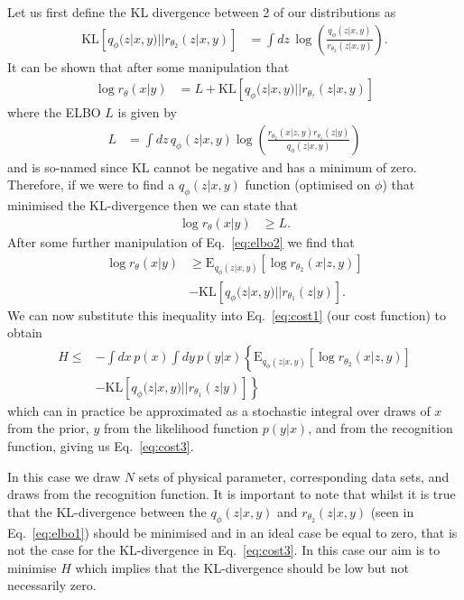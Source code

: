 \documentclass[%
showpacs,
 amsmath,amssymb,
 aps,
 twocolumn,
 prl,
 reprint,
floatfix,
]{revtex4-1}
\begin{document}
Let us first define the \ac{KL} divergence between 2 of our
distributions as
%
\begin{align}\label{eq:kl}
\text{KL}\left[q_{\phi}(z|x,y)||r_{\theta_{2}}(z|x,y)\right] &= \int dz\,
\log\left(\frac{q_{\phi}(z|x,y)}{r_{\theta_{2}}(z|x,y)}\right).
\end{align}
%  
It can be shown that after some manipulation that
%
\begin{align}\label{eq:elbo1}
\log r_{\theta}(x|y) &= L + \text{KL}\left[q_{\phi}(z|x,y)||r_{\theta_{?}}(z|x,y)\right]
\end{align}
%
where the \ac{ELBO} $L$ is given by
%
\begin{align}\label{eq:elbo2}
L &= \int dz\,
q_{\phi}(z|x,y)\log\left(\frac{r_{\theta_{2}}(x|z,y)r_{\theta_{1}}(z|y)}{q_{\phi}(z|x,y)}\right)
\end{align}
%
and is so-named since $\text{KL}$ cannot be negative and has a minimum of zero.
Therefore, if we were to find a $q_{\phi}(z|x,y)$ function (optimised on
$\phi$) that minimised the \ac{KL}-divergence then we can state that
%
\begin{align}
\log r_{\theta}(x|y) &\geq L.
\end{align}
%
After some further manipulation of Eq.~\ref{eq:elbo2} we find that
%
\begin{align}\label{eq:logr}
\log r_{\theta}(x|y) &\geq  \text{E}_{q_{\phi}(z|x,y)}\left[\log
r_{\theta_{2}}(x|z,y)\right] \nonumber\\
&-\text{KL}\left[q_{\phi}(z|x,y)||r_{\theta_{1}}(z|y)\right].
\end{align}
%
We can now substitute this inequality into Eq.~\ref{eq:cost1} (our cost
function) to obtain
%
\begin{align}\label{eq:cost2}
H \leq & -\int dx\, p(x)\int dy\,p(y|x)
\left\{\text{E}_{q_{\phi}(z|x,y)}\left[\log r_{\theta_{2}}(x|z,y)\right]
\right.\nonumber\\
&-\left.\text{KL}\left[q_{\phi}(z|x,y)||r_{\theta_{1}}(z|y)\right]\right\}  
\end{align}
%
which can in practice be approximated as a stochastic integral over draws of
$x$ from the prior, $y$ from the likelihood function $p(y|x)$, and from the
recognition function, giving us Eq.~\ref{eq:cost3}.

In this case we draw $N$ sets of physical parameter, corresponding data
sets, and draws from the recognition function. It is important to note that
whilst it is true that the \ac{KL}-divergence between the $q_{\phi}(z|x,y)$ and
$r_{\theta_{2}}(z|x,y)$ (seen in Eq.~\ref{eq:elbo1}) should be minimised and in
an ideal case be equal to zero, that is not the case for the \ac{KL}-divergence in
Eq.~\ref{eq:cost3}. In this case our aim is to minimise $H$ which implies that
the \ac{KL}-divergence should be low but not necessarily zero.
\end{document}
